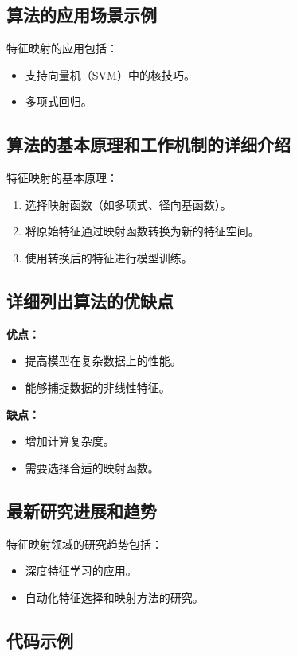 \subsection*{算法的应用场景示例}
特征映射的应用包括：
\begin{itemize}
    \item 支持向量机（SVM）中的核技巧。
    \item 多项式回归。
\end{itemize}

\subsection*{算法的基本原理和工作机制的详细介绍}
特征映射的基本原理：
\begin{enumerate}
    \item 选择映射函数（如多项式、径向基函数）。
    \item 将原始特征通过映射函数转换为新的特征空间。
    \item 使用转换后的特征进行模型训练。
\end{enumerate}

\subsection*{详细列出算法的优缺点}
\textbf{优点：}
\begin{itemize}
    \item 提高模型在复杂数据上的性能。
    \item 能够捕捉数据的非线性特征。
\end{itemize}

\textbf{缺点：}
\begin{itemize}
    \item 增加计算复杂度。
    \item 需要选择合适的映射函数。
\end{itemize}

\subsection*{最新研究进展和趋势}
特征映射领域的研究趋势包括：
\begin{itemize}
    \item 深度特征学习的应用。
    \item 自动化特征选择和映射方法的研究。
\end{itemize}
\subsection*{代码示例}
\begin{lstlisting}

\end{lstlisting}


